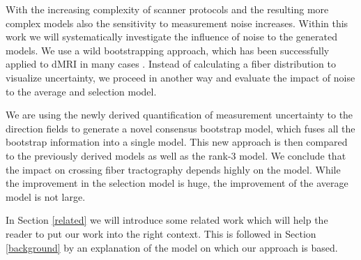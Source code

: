 With the increasing complexity of scanner protocols and the resulting more
complex models also the sensitivity to measurement noise increases. Within this work
we will systematically investigate the influence of noise to the generated
models. We use a wild bootstrapping approach, which has been
successfully applied to dMRI in many cases \cite{Jones:2008}. Instead of
calculating a fiber distribution to visualize uncertainty, we proceed in
another way and evaluate the impact of noise to the average and selection model.

We are using the newly derived quantification of measurement uncertainty to the
direction fields to generate a novel consensus bootstrap
model, which fuses all the bootstrap information into a single model. This new
approach is then compared to the previously derived models as well as the
rank-$3$ model. We conclude that the
impact on crossing fiber tractography depends highly on the model. While the
improvement in the selection model is huge, the improvement of the
average model is not large. 

In Section \ref{related} we will introduce some related work which will help the
reader to put our work into the right context. This is followed in Section \ref{background} by an
explanation of the model on which our approach is based.
